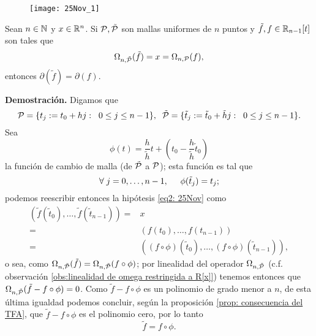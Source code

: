 \begin{figure}[H]
	\centering
	\texttt{[image: 25Nov\_1]} 
\end{figure}	


\begin{prop}
\label{prop: igualdad de grado (menor a n) si dos polinomios al discretizarse dan x}
Sean $n \in \mathbb{N}$ y $x \in \mathbb{R}^{n}$.
Si $\mathcal{P}, \tilde{\mathcal{P}}$ son mallas uniformes
de $n$ puntos y $\tilde{f}, f \in \mathbb{R}_{n-1}[t]$
son tales que
\begin{equation}
\label{eq2: 25Nov}
\Omega_{n, \tilde{\mathcal{P}}}(\tilde{f})= x = 
\Omega_{n, \mathcal{P}}(f),
\end{equation}
entonces $\partial(\tilde{f})=\partial(f)$.
\end{prop}
\noindent
\textbf{Demostración.}
Digamos que 
\[
\mathcal{P}=\{t_{j}:=t_{0}+hj: \hspace{0.2cm} 0 \leq j \leq n-1 \},
\hspace{0.2cm}
\mathcal{\tilde{P}}=\{
\tilde{t}_{j}:=\tilde{t}_{0}+ \tilde{h}j: \hspace{0.2cm} 0 \leq j \leq n-1 \}.
\]
Sea 
\[
\phi(t)= \frac{h}{\tilde{h}}t+ \left( t_{0}-  \frac{h}{\tilde{h}}
\tilde{t}_{0}  \right)
\]
la función de cambio de malla
(de $\tilde{\mathcal{P}}$ a $\mathcal{P}$); esta función es 
tal que
\[
\forall \hspace{0.1cm} j = 0, \ldots, n-1, 
\hspace{0.5cm} \phi(\tilde{t}_{j})= 
t_{j};
\]
podemos reescribir entonces la hipótesis \eqref{eq2: 25Nov}
como 
\begin{align*}
(\tilde{f}(\tilde{t}_{0}), \ldots , \tilde{f}(\tilde{t}_{n-1}))
= & x \\
=& (f(t_{0}), \ldots , f(t_{n-1})) \\
=& ((f \circ \phi) (\tilde{t}_{0}), \ldots , 
(f \circ \phi) (\tilde{t}_{n-1})),
\end{align*}
o sea, como $\Omega_{n, \tilde{\mathcal{P}}}(\tilde{f})=
\Omega_{n, \tilde{\mathcal{P}}}(f \circ \phi)$; por linealidad
del operador $\Omega_{n, \tilde{\mathcal{P}}}$
(c.f. observación 
\ref{obs:linealidad de omega restringida a R[x]})
tenemos entonces que
$\Omega_{n, \tilde{\mathcal{P}}}(\tilde{f}-f \circ \phi)=0$.
Como 
$\tilde{f}-f \circ \phi$ es un polinomio de
grado menor a $n$, de esta
última igualdad podemos concluir, 
según la proposición
\ref{prop: consecuencia del TFA}, que
$\tilde{f}-f \circ \phi$
es el polinomio cero, por lo tanto
\begin{equation*}
\label{eq3: 25Nov}
\tilde{f}=f \circ \phi.
\end{equation*}

